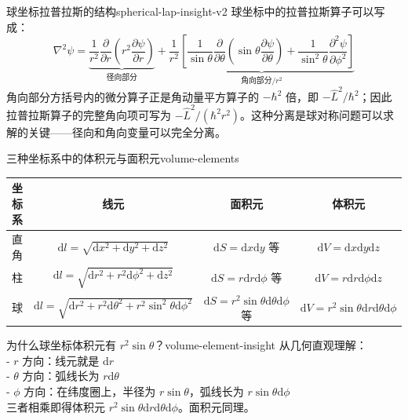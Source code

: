 \documentclass[11pt,a4paper,openany,oneside]{book}
\newcommand{\diff}{\mathrm{d}}
\newcommand{\lap}{\nabla^2}
\begin{document}
\begin{insight}{球坐标拉普拉斯的结构}{spherical-lap-insight-v2}
球坐标中的拉普拉斯算子可以写成：
\[
\lap\psi = \underbrace{\frac{1}{r^2}\frac{\partial}{\partial r}\left(r^2\frac{\partial\psi}{\partial r}\right)}_{\text{径向部分}} + \underbrace{\frac{1}{r^2}\left[\frac{1}{\sin\theta}\frac{\partial}{\partial\theta}\left(\sin\theta\frac{\partial\psi}{\partial\theta}\right) + \frac{1}{\sin^2\theta}\frac{\partial^2\psi}{\partial\phi^2}\right]}_{\text{角向部分}/r^2}
\]
角向部分方括号内的微分算子正是角动量平方算子的 $-\hbar^2$ 倍，即 $-\hat{L}^2/\hbar^2$；因此拉普拉斯算子的完整角向项可写为 $-\hat{L}^2/(\hbar^2 r^2)$。这种分离是球对称问题可以求解的关键——径向和角向变量可以完全分离。
\end{insight}

\begin{theorem}{三种坐标系中的体积元与面积元}{volume-elements}
\begin{center}
\small
\setlength{\tabcolsep}{2pt}
\begin{tabular}{@{}cccc@{}}
\toprule
\textbf{坐标系} & \textbf{线元} & \textbf{面积元} & \textbf{体积元} \\
\midrule
直角 & $\diff l = \sqrt{\diff x^2+\diff y^2+\diff z^2}$ & $\diff S = \diff x\diff y$ 等 & $\diff V = \diff x\diff y\diff z$ \\
柱 & $\diff l = \sqrt{\diff r^2+r^2\diff\phi^2+\diff z^2}$ & $\diff S = r\diff r\diff\phi$ 等 & $\diff V = r\diff r\diff\phi\diff z$ \\
球 & $\diff l = \sqrt{\diff r^2+r^2\diff\theta^2+r^2\sin^2\theta\diff\phi^2}$ & $\diff S = r^2\sin\theta\diff\theta\diff\phi$ 等 & $\diff V = r^2\sin\theta\diff r\diff\theta\diff\phi$ \\
\bottomrule
\end{tabular}
\end{center}
\end{theorem}

\begin{insight}{为什么球坐标体积元有 $r^2\sin\theta$？}{volume-element-insight}
从几何直观理解：\\
- $r$ 方向：线元就是 $\diff r$\\
- $\theta$ 方向：弧线长为 $r\diff\theta$\\
- $\phi$ 方向：在纬度圈上，半径为 $r\sin\theta$，弧线长为 $r\sin\theta\diff\phi$\\
三者相乘即得体积元 $r^2\sin\theta\diff r\diff\theta\diff\phi$。面积元同理。
\end{insight}
\end{document}
